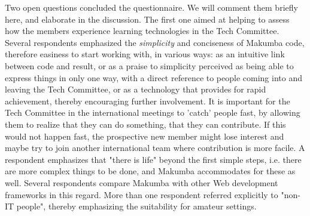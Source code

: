 \documentclass{sig-alt-release2}
\begin{document}
Two open questions concluded the questionnaire. We will comment them briefly here, and elaborate in the discussion. The first one aimed at helping to assess how the members experience learning technologies in the Tech Committee. Several respondents emphasized the \textit{simplicity} and conciseness of Makumba code, therefore easiness to start working with, in various ways: as an intuitive link between code and result,  or as a praise to simplicity perceived as being able to express things in only one way, with a direct reference to people coming into and leaving the Tech Committee,  or as a technology that provides for rapid achievement, thereby encouraging further involvement. It is important for the Tech Committee in the international meetings to 'catch' people fast, by allowing them to realize that they can do something, that they can contribute. If this would not happen fast, the prospective new member might lose interest and maybe try to join another international team where contribution is more facile. A respondent emphasizes that "there is life" beyond the first simple steps, i.e. there are more complex things to be done, and Makumba accommodates for these as well. Several respondents compare Makumba with other Web development frameworks in this regard. More than one respondent referred explicitly to "non-IT people", thereby emphasizing the suitability for amateur settings.
\end{document}
